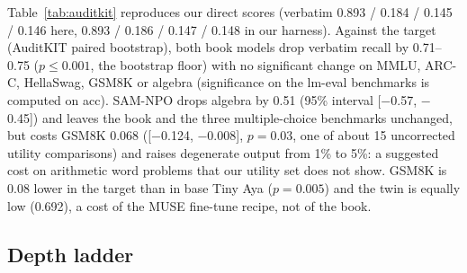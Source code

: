 \documentclass[10pt,twocolumn,letterpaper]{article}
\begin{document}
\begin{table}[t]
\centering\small
\caption{AuditKIT re-check (greedy decoding, one run per model; lower is better in the two forget columns). ARC-C and
HellaSwag show acc\_norm.}
\label{tab:auditkit}
\end{table}

Table~\ref{tab:auditkit} reproduces our direct scores (verbatim 0.893 / 0.184 / 0.145 / 0.146 here, 0.893 / 0.186 /
0.147 / 0.148 in our harness). Against the target (AuditKIT paired bootstrap), both book models drop verbatim recall by
0.71--0.75 ($p\le0.001$, the bootstrap floor) with no significant change on MMLU, ARC-C, HellaSwag, GSM8K or algebra
(significance on the lm-eval benchmarks is computed on acc). SAM-NPO drops algebra by 0.51 (95\% interval [$-$0.57,
$-$0.45]) and leaves the book and the three multiple-choice benchmarks unchanged, but costs GSM8K 0.068 ([$-$0.124,
$-$0.008], $p=0.03$, one of about 15 uncorrected utility comparisons) and raises degenerate output from 1\% to 5\%: a
suggested cost on arithmetic word problems that our utility set does not show. GSM8K is 0.08 lower in the target than in
base Tiny Aya ($p=0.005$) and the twin is equally low (0.692), a cost of the MUSE fine-tune recipe, not of the book.

\subsection{Depth ladder}
\end{document}
